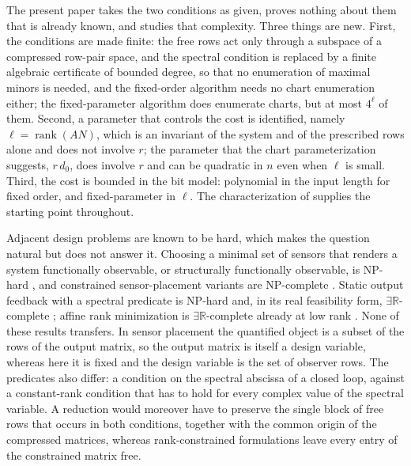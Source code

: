 \documentclass[journal]{IEEEtran}
\theoremstyle{plainn}
\theoremstyle{remark}
\begin{document}
The present paper takes the two conditions as given, proves nothing about them that is already
known, and studies that complexity. Three things are new. First, the conditions are made
finite: the free rows act only through a subspace of a compressed row-pair space, and the
spectral condition is replaced by a finite algebraic certificate of bounded degree, so that no
enumeration of maximal minors is needed, and the fixed-order algorithm needs no chart enumeration
either; the fixed-parameter algorithm does enumerate charts, but at most $4^{\ell}$ of them. Second, a parameter that
controls the cost is identified, namely $\ell=\operatorname{rank}(AN)$, which is an invariant
of the system and of the prescribed rows alone and does not involve $r$; the parameter that
the chart parameterization suggests, $r\,d_0$, does involve $r$ and can be quadratic in $n$
even when $\ell$ is small. Third, the cost is bounded in the bit model: polynomial in the input
length for fixed order, and fixed-parameter in $\ell$. The characterization of \cite{fer10,dar25,fer26a,fer26b} supplies the starting point
throughout.

Adjacent design problems are known to be hard, which makes the question natural but does
not answer it. Choosing a minimal set of sensors that renders a system functionally
observable, or structurally functionally observable, is NP-hard \cite{zha25}, and
constrained sensor-placement variants are NP-complete \cite{dey21}. Static output
feedback with a spectral predicate is NP-hard \cite{lof26,bar26} and, in its real
feasibility form, $\exists\mathbb R$-complete \cite{liu26}; affine rank minimization is
$\exists\mathbb R$-complete already at low rank \cite{maj26}. None of these results
transfers. In sensor placement the quantified object is a subset of the rows of the
output matrix, so the output matrix is itself a design variable, whereas here it is fixed
and the design variable is the set of observer rows. The predicates also differ: a
condition on the spectral abscissa of a closed loop, against a constant-rank condition
that has to hold for every complex value of the spectral variable. A reduction would
moreover have to preserve the single block of free rows that occurs in both conditions,
together with the common origin of the compressed matrices, whereas rank-constrained
formulations leave every entry of the constrained matrix free.
\end{document}
